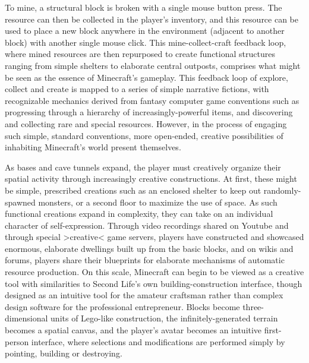 To mine, a structural block is broken with a single mouse button press. The resource can then be collected in the player's inventory, and this resource can be used to place a new block anywhere in the environment (adjacent to another block) with another single mouse click. This mine-collect-craft feedback loop, where mined resources are then repurposed to create functional structures ranging from simple shelters to elaborate central outposts, comprises what might be seen as the essence of Minecraft's gameplay. This feedback loop of explore, collect and create is mapped to a series of simple narrative fictions, with recognizable mechanics derived from fantasy computer game conventions such as progressing through a hierarchy of increasingly-powerful items, and discovering and collecting rare and special resources. However, in the process of engaging such simple, standard conventions, more open-ended, creative possibilities of inhabiting Minecraft's world present themselves.

As bases and cave tunnels expand, the player must creatively organize their spatial activity through increasingly creative constructions. At first, these might be simple, prescribed creations such as an enclosed shelter to keep out randomly-spawned monsters, or a second floor to maximize the use of space. As such functional creations expand in complexity, they can take on an individual character of self-expression. Through video recordings shared on Youtube and through special >creative< game servers, players have constructed and showcased enormous, elaborate dwellings built up from the basic blocks, and on wikis and forums, players share their blueprints for elaborate mechanisms of automatic resource production. On this scale, Minecraft can begin to be viewed as a creative tool with similarities to Second Life's own building-construction interface, though designed as an intuitive tool for the amateur craftsman rather than complex design software for the professional entrepreneur. Blocks become three-dimensional units of Lego-like construction, the infinitely-generated terrain becomes a spatial canvas, and the player's avatar becomes an intuitive first-person interface, where selections and modifications are performed simply by pointing, building or destroying.

